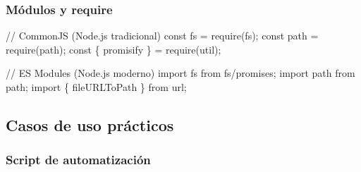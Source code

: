 \documentclass[
  11pt,
  letterpaper,
  oneside,
  openany]{scrbook}
\newenvironment{Shaded}{}{}
\newcommand{\CommentTok}[1]{\textcolor[rgb]{0.42,0.45,0.49}{#1}}
\newcommand{\ImportTok}[1]{\textcolor[rgb]{0.01,0.18,0.38}{#1}}
\newcommand{\KeywordTok}[1]{\textcolor[rgb]{0.84,0.23,0.29}{#1}}
\newcommand{\NormalTok}[1]{\textcolor[rgb]{0.14,0.16,0.18}{#1}}
\newcommand{\OperatorTok}[1]{\textcolor[rgb]{0.14,0.16,0.18}{#1}}
\newcommand{\PreprocessorTok}[1]{\textcolor[rgb]{0.84,0.23,0.29}{#1}}
\newcommand{\StringTok}[1]{\textcolor[rgb]{0.01,0.18,0.38}{#1}}
\begin{document}
\subsubsection{Módulos y require}\label{muxf3dulos-y-require}

\begin{Shaded}
\begin{Highlighting}[]
\CommentTok{// CommonJS (Node.js tradicional)}
\KeywordTok{const}\NormalTok{ fs }\OperatorTok{=} \PreprocessorTok{require}\NormalTok{(}\StringTok{\textquotesingle{}fs\textquotesingle{}}\NormalTok{)}\OperatorTok{;}
\KeywordTok{const}\NormalTok{ path }\OperatorTok{=} \PreprocessorTok{require}\NormalTok{(}\StringTok{\textquotesingle{}path\textquotesingle{}}\NormalTok{)}\OperatorTok{;}
\KeywordTok{const}\NormalTok{ \{ promisify \} }\OperatorTok{=} \PreprocessorTok{require}\NormalTok{(}\StringTok{\textquotesingle{}util\textquotesingle{}}\NormalTok{)}\OperatorTok{;}

\CommentTok{// ES Modules (Node.js moderno)}
\ImportTok{import}\NormalTok{ fs }\ImportTok{from} \StringTok{\textquotesingle{}fs/promises\textquotesingle{}}\OperatorTok{;}
\ImportTok{import}\NormalTok{ path }\ImportTok{from} \StringTok{\textquotesingle{}path\textquotesingle{}}\OperatorTok{;}
\ImportTok{import}\NormalTok{ \{ fileURLToPath \} }\ImportTok{from} \StringTok{\textquotesingle{}url\textquotesingle{}}\OperatorTok{;}
\end{Highlighting}
\end{Shaded}

\subsection{Casos de uso prácticos}\label{casos-de-uso-pruxe1cticos-1}

\subsubsection{Script de
automatización}\label{script-de-automatizaciuxf3n}
\end{document}
